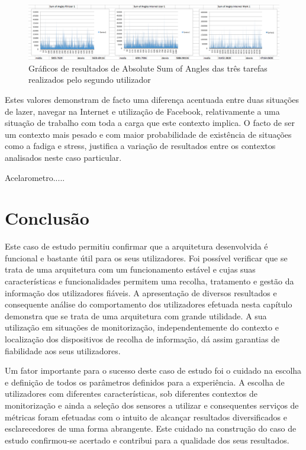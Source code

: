  \begin{figure}[htb]
   \centering
   \includegraphics[scale=0.3]{Images/sumofangles.png}
   \caption{Gráficos de resultados de Absolute Sum of Angles das três tarefas realizados pelo segundo utilizador}
\end{figure}

Estes valores demonstram de facto uma diferença acentuada entre duas situações de lazer, navegar na Internet e utilização de Facebook, relativamente a uma situação de trabalho com toda a carga que este contexto implica. O facto de ser um contexto mais pesado e com maior probabilidade de existência de situações como a fadiga e stress, justifica a variação de resultados entre os contextos analisados neste caso particular.

Acelarometro.....


\section{Conclusão}

Este caso de estudo permitiu confirmar que a arquitetura desenvolvida é funcional e bastante útil para os seus utilizadores. Foi possível verificar que se trata de uma arquitetura com um funcionamento estável e cujas suas características e funcionalidades permitem uma recolha, tratamento e gestão da informação dos utilizadores fiáveis. A apresentação de diversos resultados e consequente análise do comportamento dos utilizadores efetuada nesta capítulo demonstra que se trata de uma arquitetura com grande utilidade. A sua utilização em situações de monitorização, independentemente do contexto e localização dos dispositivos de recolha de informação, dá assim garantias de fiabilidade aos seus utilizadores.

Um fator importante para o sucesso deste caso de estudo foi o cuidado na escolha e definição de todos os parâmetros definidos para a experiência. A escolha de utilizadores com diferentes características, sob diferentes contextos de monitorização e ainda a seleção dos sensores a utilizar e consequentes serviços de métricas foram efetuadas com o intuito de alcançar resultados diversificados e esclarecedores de uma forma abrangente. Este cuidado na construção do caso de estudo confirmou-se acertado e contribui para a qualidade dos seus resultados.

